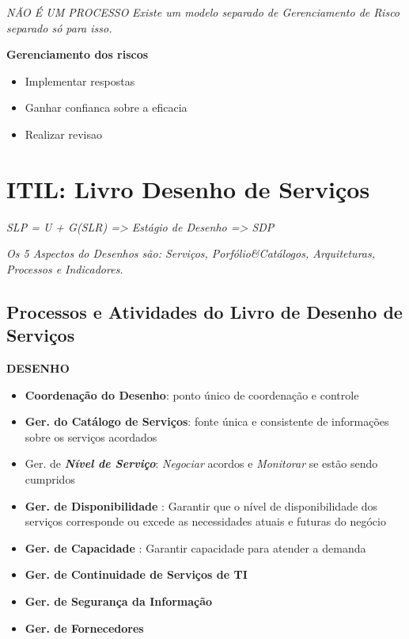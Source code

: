 \begin{center}
	\emph{NÃO É UM PROCESSO}
	\emph{Existe um modelo separado de Gerenciamento de Risco separado só para isso.}
\end{center}

\textbf{Gerenciamento dos riscos}
\begin{itemize}
	\item Implementar respostas
	\item Ganhar confianca sobre a eficacia
	\item Realizar revisao
\end{itemize}


\section{ITIL: Livro Desenho de Serviços}

\begin{center}
	\emph{SLP = U + G(SLR) => Estágio de Desenho => SDP}
\end{center}

\begin{center}
	\emph{Os 5 Aspectos do Desenhos são: Serviços, Porfólio\&Catálogos, Arquiteturas, Processos e Indicadores.}
\end{center}

\subsection{Processos e Atividades do Livro de Desenho de Serviços}

\textbf{DESENHO}
\begin{itemize}
	\item \textbf{Coordenação do Desenho}: ponto único de coordenação e controle
	\item \textbf{Ger. do Catálogo de Serviços}:  fonte única e consistente de informações sobre os serviços acordados
	\item Ger. de \textbf{\emph{Nível de Serviço}}: \emph{Negociar} acordos e \emph{Monitorar} se estão sendo cumpridos
	\item \textbf{Ger. de Disponibilidade} : Garantir que o nível de disponibilidade dos serviços corresponde ou excede as necessidades atuais e futuras do negócio 
	\item \textbf{Ger. de Capacidade} : Garantir capacidade para atender a demanda
	\item \textbf{Ger. de Continuidade de Serviços de TI} 
	\item \textbf{Ger. de Segurança da Informação} 
	\item \textbf{Ger. de Fornecedores} 
\end{itemize}

